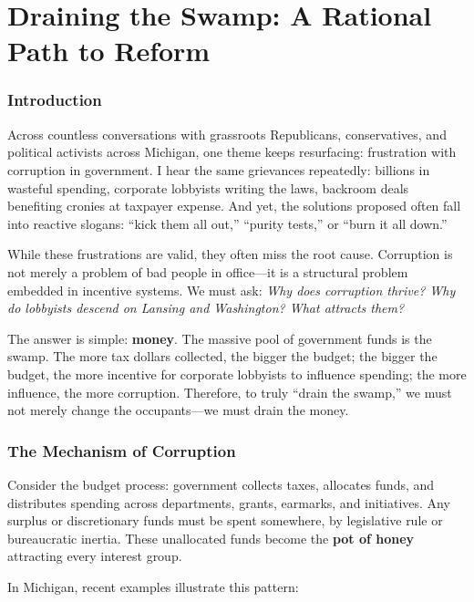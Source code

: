 \part{Draining the Swamp: A Rational Path to Reform}


\section{Introduction}

Across countless conversations with grassroots Republicans, conservatives, and political activists across Michigan, one theme keeps resurfacing: frustration with corruption in government. I hear the same grievances repeatedly: billions in wasteful spending, corporate lobbyists writing the laws, backroom deals benefiting cronies at taxpayer expense. And yet, the solutions proposed often fall into reactive slogans: ``kick them all out,'' ``purity tests,'' or ``burn it all down.''

While these frustrations are valid, they often miss the root cause. Corruption is not merely a problem of bad people in office—it is a structural problem embedded in incentive systems. We must ask: \emph{Why does corruption thrive? Why do lobbyists descend on Lansing and Washington? What attracts them?}

The answer is simple: \textbf{money}. The massive pool of government funds is the swamp. The more tax dollars collected, the bigger the budget; the bigger the budget, the more incentive for corporate lobbyists to influence spending; the more influence, the more corruption. Therefore, to truly ``drain the swamp,'' we must not merely change the occupants—we must drain the money.

\section{The Mechanism of Corruption}

Consider the budget process: government collects taxes, allocates funds, and distributes spending across departments, grants, earmarks, and initiatives. Any surplus or discretionary funds must be spent somewhere, by legislative rule or bureaucratic inertia. These unallocated funds become the \textbf{pot of honey} attracting every interest group.

In Michigan, recent examples illustrate this pattern:

